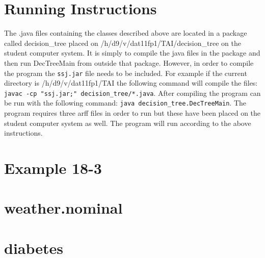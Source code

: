 \documentclass[a4paper]{article}
\begin{document}
\section{Running Instructions} The .java files containing the classes described
above are located in a package called decision\_tree placed on
/h/d9/v/dat11fp1/TAI/decision\_tree on the student computer system. It
is simply to compile the java files in the package and then run DecTreeMain from
outside that package. However, in order to compile the program the \texttt{ssj.jar} file needs to be included. For example if the current directory is
/h/d9/v/dat11fp1/TAI the following command will compile the files: \texttt{javac -cp "ssj.jar;"
decision\_tree/*.java}. After compiling the program can be run with
the following command: \texttt{java decision\_tree.DecTreeMain}. The program requires three arff files in order to run but these have been placed on the student computer system as well. The program will run according to the above instructions.

\appendix
\section{Example 18-3}
\label{18-3}
\section{weather.nominal}
\label{weather}
\section{diabetes}
\label{diabetes}
\end{document}
